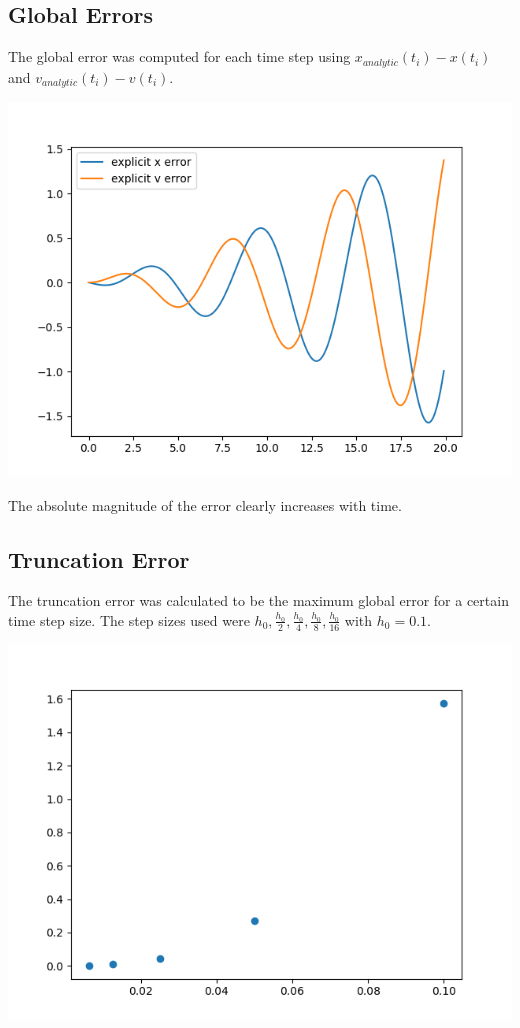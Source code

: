 \documentclass{article}
\begin{document}
\subsection{Global Errors}
The global error was computed for each time step using $ x_{analytic}(t_i) - x(t_i) $ and $ v_{analytic}(t_i) - v(t_i) $.

\includegraphics[scale=0.9]{images/explicit_error.png}

The absolute magnitude of the error clearly increases with time.

\subsection{Truncation Error}
The truncation error was calculated to be the maximum global error for a certain time step size. The step sizes used were $h_0, \frac{h_0}{2}, \frac{h_0}{4}, \frac{h_0}{8}, \frac{h_0}{16}$ with $h_0 = 0.1$.

\includegraphics[scale=0.9]{images/truncation_error.png}
\end{document}
